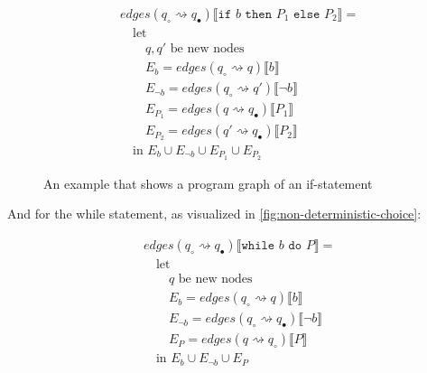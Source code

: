 \begin{equation}
    \begin{split}
        &edges(q_\circ \rightsquigarrow q_\bullet) \lBrack \texttt{if } b \texttt{ then } P_1 \texttt{ else } P_2 \rBrack = \\
        &\quad \text{let } \\
        &\quad\quad q, q' \text{ be new nodes} \\
        &\quad\quad E_{b} = edges(q_\circ \rightsquigarrow q) \lBrack b \rBrack \\
        &\quad\quad E_{\neg b} = edges(q_\circ \rightsquigarrow q') \lBrack \neg b \rBrack \\
        &\quad\quad E_{P_1}= edges(q \rightsquigarrow q_\bullet) \lBrack P_1 \rBrack \\
        &\quad\quad E_{P_2}= edges(q' \rightsquigarrow q_\bullet) \lBrack P_2 \rBrack \\
        &\quad \text{in } E_{b} \cup E_{\neg b} \cup E_{P_1} \cup E_{P_2}
    \end{split}\label{eq:equation8}
\end{equation}

\begin{figure}[htb!]
    \center
    
    \caption{An example that shows a program graph of an if-statement}
    \label{fig:tikz-program-graph-if}
\end{figure}

And for the while statement, as visualized in \autoref{fig:non-deterministic-choice}:

\begin{equation}
    \begin{split}
        &edges(q_\circ \rightsquigarrow q_\bullet) \lBrack \texttt{while } b \texttt{ do } P \rBrack = \\
        &\quad \text{let } \\
        &\quad\quad q \text{ be new nodes} \\
        &\quad\quad E_{b} = edges(q_\circ \rightsquigarrow q) \lBrack b \rBrack \\
        &\quad\quad E_{\neg b} = edges(q_\circ \rightsquigarrow q_\bullet) \lBrack \neg b \rBrack \\
        &\quad\quad E_{P} = edges(q \rightsquigarrow q_\circ) \lBrack P \rBrack \\
        &\quad \text{in } E_{b} \cup E_{\neg b} \cup E_{P}
    \end{split}\label{eq:equation9}
\end{equation}

